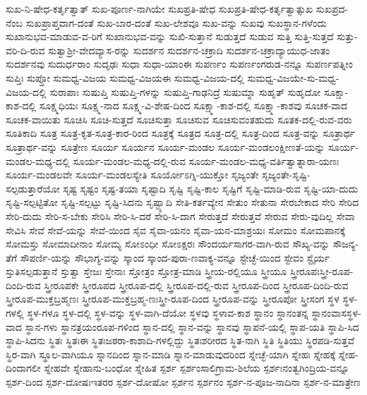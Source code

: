 {ಸುಖ-ನಿ-ಷೇಧ-ಕರ್ತೃತ್ವಾತ್
ಸುಖ-ಪೂರ್ಣ-ನಾಗಿಯೇ
ಸುಖಪ್ರತಿ-ಷೇಧ
ಸುಖಪ್ರತಿ-ಷೇಧ-ಕರ್ತೃತ್ವಾತ್ಸುಖ
ಸುಖಪ್ರದ-ನೆಂಬ
ಸುಖಪ್ರಾಪ್ತವಾಗ-ದಂತೆ
ಸುಖ-ಬಾರ-ದಂತೆ
ಸುಖ-ಲೇಶವೂ
ಸುಖ-ವನ್ನು
ಸುಖವು
ಸುಖಸ್ಥಾನ-ಗಳೆಂದು
ಸುಖಾನುಭವ-ಮಾಡುವ-ವ-ರಿಗೆ
ಸುಖಾನುಭವ-ವನ್ನು
ಸುಖಿ-ಸುತ್ತಾನೆ
ಸುಡುತ್ತದೆ
ಸುಡುವ
ಸುತ್ತಿ
ಸುತ್ತಿ-ಸುತ್ತದೆ
ಸುತ್ತು-ವರಿ-ದಿ-ರುವ
ಸುತ್ವಾಶ್ರೀ-ವೇದವ್ಯಾಸ-ರನ್ನು
ಸುದರ್ಶನ
ಸುದರ್ಶನ-ಚಕ್ರಾದಿ
ಸುದರ್ಶನ-ಚಕ್ರಾದ್ಯಾಯುಧ-ಜಾತಂ
ಸುದರ್ಶನವು
ಸುದುರ್ಧರಾಂ
ಸುದೃಢಃ
ಸುಧಾ
ಸುಧಾ-ಯಾಂಈ
ಸುಪರ್ಣಂ
ಸುಪರ್ಣಂಗರುಡ-ನನ್ನೂ
ಸುಪರ್ಣಪತ್ನೀಂ
ಸುಪ್ತಿಃ
ಸುಪ್ತೋ
ಸುಮಧ್ವ-ವಿಜಯ
ಸುಮಧ್ವ-ವಿಜಯಈ
ಸುಮಧ್ವ-ವಿಜಯ-ದಲ್ಲಿ
ಸುಮಧ್ವ-ವಿಜಯೇ-ಸು-ಮಧ್ವ-ವಿಜಯ-ದಲ್ಲಿ
ಸುರಾಪಾಃ
ಸುಷುಪ್ತಿ
ಸುಷುಪ್ತಿ-ಗಳನ್ನು
ಸುಷುಪ್ತಿ-ಗಾಢನಿದ್ರೆ
ಸುಷುಮ್ನಾ
ಸುಹೃತ್
ಸುಹೃದೋ
ಸೂಕ್ಷಾ-ಕಾಶ-ದಲ್ಲಿ
ಸೂಕ್ಷ್ಮಧಿಯಃ
ಸೂಕ್ಷ್ಮ-ನಾದ
ಸೂಕ್ಷ್ಮ-ವಿ-ಶೇಷ-ದಿಂದ
ಸೂಕ್ಷ್ಮಾ-ಕಾಶ-ದಲ್ಲಿ
ಸೂಕ್ಷ್ಮಾ-ಕಾಶವು
ಸೂಚಕ-ವಾದ
ಸೂಚಕ-ವಾಯಿತು
ಸೂಚಿಸಿ
ಸೂಚಿ-ಸುತ್ತದೆ
ಸೂಚಿಸುತ್ತಾ
ಸೂಚಿಸುವ
ಸೂಚಿಸುವಂತಹುದು
ಸೂತಕ-ದಲ್ಲಿ-ರುವ-ವರು
ಸೂತಿಕಾದಿ
ಸೂತ್ರ
ಸೂತ್ರ-ಕೃತ-ಸೂತ್ರ-ಕಾರ-ರಿಂದ
ಸೂತ್ರಕ್ಕೆ
ಸೂತ್ರದ
ಸೂತ್ರ-ದಲ್ಲಿ
ಸೂತ್ರ-ದಿಂದ
ಸೂತ್ರ-ವನ್ನು
ಸೂತ್ರಾರ್ಥ
ಸೂತ್ರಾರ್ಥ-ವನ್ನು
ಸೂತ್ರೇಣ
ಸೂರ್ಯ
ಸೂರ್ಯನ
ಸೂರ್ಯ-ಮಂಡಲ
ಸೂರ್ಯ-ಮಂಡಲಂಕ್ಷೀಣತೆ-ಯನ್ನು
ಸೂರ್ಯ-ಮಂಡಲ-ಮಧ್ಯ-ದಲ್ಲಿ
ಸೂರ್ಯ-ಮಂಡಲ-ಮಧ್ಯ-ದಲ್ಲಿ-ರುವ
ಸೂರ್ಯ-ಮಂಡಲ-ಮಧ್ಯ-ವರ್ತಿತ್ವಾತ್ನಾರಾ-ಯಣಃ
ಸೂರ್ಯ-ಮಂಡಲವೇ
ಸೂರ್ಯ-ಮಂಡಲಸ್ಯೇತಿ
ಸೂರ್ಯೋಽಗ್ನಿ-ಯುಕ್ತೋ
ಸೃಜ್ಯಂತೇ
ಸೃಜ್ಯಂತೇ-ಸೃಷ್ಟಿ-ಸಲ್ಪಡುತ್ತಾರೆಯೋ
ಸೃಷ್ಟ
ಸೃಷ್ಟಂ
ಸೃಷ್ಟ-ತಯಾ
ಸೃಷ್ಟಾದಿ
ಸೃಷ್ಟಿ
ಸೃಷ್ಟಿ-ಕಾಲ
ಸೃಷ್ಟಿಗೆ
ಸೃಷ್ಟಿ-ಮಾಡಿ-ರುವ
ಸೃಷ್ಟಿ-ಯಾ-ದುದು
ಸೃಷ್ಟಿ-ಸಲ್ಪಟ್ಟಿತೋ
ಸೃಷ್ಟಿ-ಸಲ್ಪಟ್ಟು
ಸೃಷ್ಟಿ-ಸಿದನು
ಸೃಷ್ಟ್ಯಾದಿ
ಸೇತಿ-ಕರ್ತವ್ಯೇನ
ಸೇತುಂ
ಸೇತುನಾ
ಸೇರಬೇಕಾದ
ಸೇರಿ
ಸೇರಿದ
ಸೇರಿ-ದುದು
ಸೇರಿ-ಸ-ಬೇಕು
ಸೇರಿಸಿ
ಸೇರಿ-ಸಿ-ದರೆ
ಸೇರಿ-ಸಿ-ದಾಗ
ಸೇರುತ್ತದೆ
ಸೇರುತ್ತವೆ
ಸೇರುವ
ಸೇರು-ವುದಿಲ್ಲ
ಸೇವಾ
ಸೇವಿಸಿ
ಸೇವೆ
ಸೇವೆ-ಯನ್ನು
ಸೇವೆ-ಯಿಂದ
ಸೈವ
ಸೈವಾ-ಯನಂ
ಸೈವಾ-ಯನ-ಮಾಶ್ರಯಃ
ಸೋಮಂ
ಸೋಮಪಾನಕ್ಕೆ
ಸೋಮಸ್ತು
ಸೋಮಾದೀನಾಂ
ಸೋಮ್ಯ
ಸೋಽಂಧೀ
ಸೋಽಕ್ಷರಃ
ಸೌಂದರ್ಯಸಾಗರ-ವಾಗಿ-ರುವ
ಸೌಖ್ಯ-ವನ್ನು
ಸೌಜನ್ಯ-ತೆಗೆ
ಸೌಪರ್ಣಿ-ಯನ್ನು
ಸೌಭಾಗ್ಯ-ವನ್ನು
ಸ್ಕಾಂದ
ಸ್ಕಾಂದ-ಪುರಾ-ಣವಾಕ್ಯ-ವನ್ನೂ
ಸ್ಟೇಚ್ಛೆ-ಯಿಂದ
ಸ್ಟೇವಂ
ಸ್ಟೈರ್ಯ
ಸ್ತುತಿಸಲ್ಪಡುತ್ತಾನೆ
ಸ್ತುತ್ವಾ
ಸ್ತೇಜಃ
ಸ್ತೇನಾಃ
ಸ್ತೋತ್ರಂ
ಸ್ತೋತ್ರ-ಮಾಡಿ
ಸ್ತ್ರೀಯ-ರಲ್ಲಿಯೂ
ಸ್ತ್ರೀಯೂ
ಸ್ತ್ರೀರೂಪಃಸ್ತ್ರೀ-ರೂಪ-ದಿಂದಿ-ರುವ
ಸ್ತ್ರೀರೂಪಕೇ
ಸ್ತ್ರೀರೂಪದ
ಸ್ತ್ರೀರೂಪ-ದಲ್ಲಿ
ಸ್ತ್ರೀರೂಪ-ದಲ್ಲಿ-ರುವ
ಸ್ತ್ರೀರೂಪ-ದಿಂದ
ಸ್ತ್ರೀರೂಪ-ದಿಂದಿ-ರುವ
ಸ್ತ್ರೀರೂಪ-ಮುಕ್ತಬ್ರಹ್ಮಣಃ
ಸ್ತ್ರೀರೂಪ-ಮುಕ್ತಬ್ರಹ್ಮ-ಣಃಸ್ತ್ರೀ-ರೂಪ-ದಿಂದ
ಸ್ತ್ರೀರೂಪ-ವನ್ನು
ಸ್ತ್ರೀರೂಪೋ
ಸ್ತ್ರೀಸಂಗ
ಸ್ಥಳ
ಸ್ಥಳ-ಗಳಲ್ಲಿ
ಸ್ಥಳ-ಗಳೂ
ಸ್ಥಳ-ದಲ್ಲಿ
ಸ್ಥಳ-ವನ್ನು
ಸ್ಥಳ-ವಾಗಿ-ದೆಯೋ
ಸ್ಥಳವು
ಸ್ಥಳಾವ-ಕಾಶ
ಸ್ಥಾನಂ
ಸ್ಥಾನಂತನ್ನ
ಸ್ಥಾನಂವಾಸಸ್ಥಳ-ವಾದ
ಸ್ಥಾನ-ಗಳು
ಸ್ಥಾನತ್ರಯಂರೂಪ-ಗಳಿಂದ
ಸ್ಥಾನ-ದಲ್ಲಿ
ಸ್ಥಾನ-ವನ್ನು
ಸ್ಥಾನವು
ಸ್ಥಾಪನೆ-ಯಲ್ಲಿ
ಸ್ಥಾಪ-ಯತಿ
ಸ್ಥಾಪಿ-ಸಿದ
ಸ್ಥಾಪಿ-ಸಿದನು
ಸ್ಥಿತಃ
ಸ್ಥಿತಃಈ
ಸ್ಥಿತಃಜಠರಾ-ಕಾಶಾದಿ-ಗಳಲ್ಲಿದ್ದು
ಸ್ಥಿತಃಶರೀರದ
ಸ್ಥಿತ-ನಾಗಿ
ಸ್ಥಿತಿ
ಸ್ಥಿತಿಯು
ಸ್ಥಿರಪಡಿ-ಸುತ್ತವೆ
ಸ್ಥಿರ-ವಾಗಿ
ಸ್ಥೂಲ-ವಾಗಿಯೂ
ಸ್ನಾನದಿಂದ
ಸ್ನಾನ-ಮಾಡಿ
ಸ್ನಾನ-ಮಾಡುವುದರಿಂದ
ಸ್ನೇಚ್ಛೆ-ಯಾಗಿ
ಸ್ನೇಹಃ
ಸ್ನೇಹಕ್ಕೆ
ಸ್ನೇಹ-ದಿಂದಾಗಲೀ
ಸ್ನೇಹವೇ
ಸ್ನೇಹಾನು-ಬಂಧೋ
ಸ್ನೇಹಿತ
ಸ್ಪರ್ಶ
ಸ್ಪರ್ಶಂಸಾಲಿಗ್ರಾಮ-ಶಿಲೆಯ
ಸ್ಪರ್ಶಃನಂತ್ವಗಿಂದ್ರಿಯ-ವನ್ನೂ
ಸ್ಪರ್ಶ-ದಿಂದ
ಸ್ಪರ್ಶ-ದೋಷಃಇತರರ
ಸ್ಪರ್ಶ-ದೋಷೋ
ಸ್ಪರ್ಶನ
ಸ್ಪರ್ಶನಂ
ಸ್ಪರ್ಶ-ನ-ಪೂಜ-ನಾದಿನಾ
ಸ್ಪರ್ಶ-ನ-ಮಾತ್ರೇಣ
}

